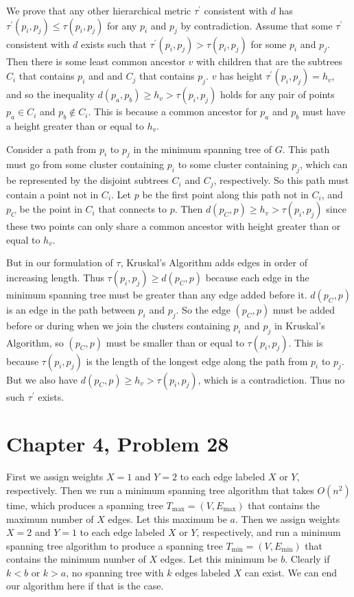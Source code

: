 \documentclass[12pt]{article}
\begin{document}
We prove that any other hierarchical metric \(\tau^\prime\) consistent with \(d\) has \(\tau^\prime(p_i,p_j)\leq\tau(p_i,p_j)\) for any \(p_i\)
and \(p_j\) by contradiction. Assume that some \(\tau^\prime\) consistent with \(d\) exists such that \(\tau^\prime(p_i,p_j)>\tau(p_i,p_j)\)
for some \(p_i\) and \(p_j\). Then there is some least common ancestor \(v\) with children that are the subtrees \(C_i\) that contains \(p_i\) and
and \(C_j\) that contains \(p_j\). \(v\) has height \(\tau^\prime(p_i,p_j)=h_v\), and so the inequality \(d(p_a,p_b)\geq h_v> \tau(p_i,p_j)\) holds
for any pair of points \(p_a \in C_i\) and \(p_b \notin C_i\). This is because a common ancestor for \(p_a\) and \(p_b\) must have a height greater
than or equal to \(h_v\).

Consider a path from \(p_i\) to \(p_j\) in the minimum spanning tree of \(G\). This path must go from some cluster containing \(p_i\) to some cluster
containing \(p_j\), which can be represented by the disjoint subtrees \(C_i\) and \(C_j\), respectively. So this path must contain a point not in
\(C_i\). Let \(p\) be the first point along this path not in \(C_i\), and \(p_C\) be the point in \(C_i\) that connects to \(p\).
Then \(d(p_C,p)\geq h_v> \tau(p_i,p_j)\) since these two points can only share a common ancestor with height greater than or equal to \(h_v\).

But in our formulation of \(\tau\), Kruskal's Algorithm adds edges in order of increasing length. Thus \(\tau(p_i,p_j)\geq d(p_C,p)\) because each edge
in the minimum spanning tree must be greater than any edge added before it. \(d(p_C,p)\) is an edge in the path between \(p_i\) and \(p_j\). So the edge
\((p_C,p)\) must be added before or during when we join the clusters containing \(p_i\) and \(p_j\) in Kruskal's Algorithm, so \((p_C,p)\) must be smaller
than or equal to \(\tau(p_i,p_j)\). This is because \(\tau(p_i,p_j)\) is the length of the longest edge along the path from \(p_i\) to \(p_j\). But we
also have \(d(p_C,p)\geq h_v> \tau(p_i,p_j)\), which is a contradiction. Thus no such \(\tau^\prime\) exists.

\pagebreak

\section*{Chapter 4, Problem 28}

First we assign weights \(X=1\) and \(Y=2\) to each edge labeled \(X\) or \(Y\), respectively. Then we run a minimum spanning tree
algorithm that takes \(O(n^2)\) time, which produces a spanning tree \(T_\text{max}=(V,E_\text{max})\) that contains the maximum
number of \(X\) edges. Let this maximum be \(a\). Then we assign weights \(X=2\) and \(Y=1\) to each edge labeled \(X\) or \(Y\),
respectively, and run a minimum spanning tree algorithm to produce a spanning tree \(T_\text{min}=(V,E_\text{min})\) that contains
the minimum number of \(X\) edges. Let this minimum be \(b\). Clearly if \(k<b\) or \(k>a\), no spanning tree with \(k\) edges labeled
\(X\) can exist. We can end our algorithm here if that is the case.
\end{document}
